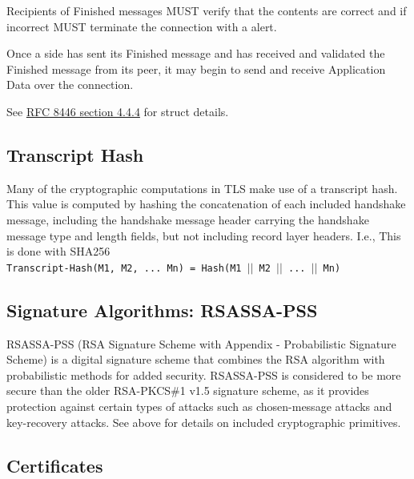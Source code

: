 \documentclass{article}
\newcommand{\code}[1]{\tcbox[
    on line,
    colback=codebackground, boxsep=2pt,
    colframe=white, boxrule=0pt,
    top=0pt, bottom=0pt, left=0pt, right=0pt
]{\texttt{#1}}}
\begin{document}
Recipients of Finished messages MUST verify that the contents are
correct and if incorrect MUST terminate the connection with a \code{decrypt\_error} alert.

Once a side has sent its Finished message and has received and validated the Finished message from its peer,
it may begin to send and receive Application Data over the connection.

See \href{https://datatracker.ietf.org/doc/html/rfc8446#section-4.4.4}{RFC 8446 section 4.4.4\tiny\faExternalLink} for struct details.

\subsection{Transcript Hash}
Many of the cryptographic computations in TLS make use of a
transcript hash.  This value is computed by hashing the concatenation
of each included handshake message, including the handshake message
header carrying the handshake message type and length fields, but not
including record layer headers.  I.e., This is done with SHA256\\

\texttt{Transcript-Hash(M1, M2, ... Mn) = Hash(M1 $||$ M2 $||$ ... $||$ Mn)}

\subsection{Signature Algorithms: RSASSA-PSS}
RSASSA-PSS (RSA Signature Scheme with Appendix - Probabilistic Signature Scheme) is a digital signature scheme that combines the RSA algorithm with probabilistic methods for added security.
RSASSA-PSS is considered to be more secure than the older RSA-PKCS\#1 v1.5 signature scheme,
as it provides protection against certain types of attacks such as chosen-message attacks and key-recovery attacks.
See above for details on included cryptographic primitives.

\subsection{Certificates}

\end{document}
